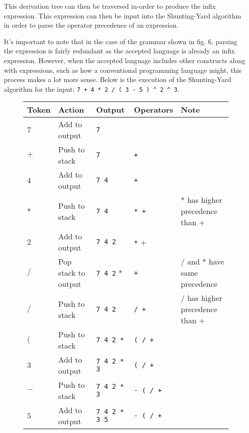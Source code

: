 \documentclass[12pt, letterpaper]{article}
\theoremstyle{definition}
\begin{document}
This derivation tree can then be traversed in-order to produce the infix expression. This expression can then be input into the Shunting-Yard algorithm in order to parse the operator precedence of an expression.

It's important to note that in the case of the grammar shown in fig. 6, parsing the expression is fairly redundant as the accepted language is already an infix expression. However, when the accepted language includes other constructs along with expressions, such as how a conventional programming language might, this process makes a lot more sense. Below is the execution of the Shunting-Yard algorithm for the input: \verb|7 + 4 * 2 / ( 3 - 5 ) ^ 2 ^ 3|.\textsuperscript{\cite{shunting-yard}}

\begin{figure}[H]
    \begin{center}
        \begin{tabular}{| m{1.2cm} | m{3.1cm} | m{3.6cm} | m{2.3cm} | m{3.5cm} |}
            \hline
            \textbf{Token} & \textbf{Action} & \textbf{Output} & \textbf{Operators} & \textbf{Note}\\
            \hline
            $7$ & Add to output & \verb|7| & &\\
            \hline
            $+$ & Push to stack & \verb|7| & \verb|+| &\\
            \hline
            $4$ & Add to output & \verb|7 4| & \verb|+| &\\
            \hline
            $*$ & Push to stack & \verb|7 4| & \verb|* +| & * has higher precedence than +\\
            \hline
            $2$ & Add to output & \verb|7 4 2| & \verb|*| + &\\
            \hline
            $/$ & Pop stack to output & \verb|7 4 2| * & \verb|+| & / and * have same precedence\\
            \hline
            $/$ & Push to stack & \verb|7 4 2| & \verb|/ +| & / has higher precedence than +\\
            \hline
            $($ & Push to stack & \verb|7 4 2 *| & \verb|( / +| &\\
            \hline
            $3$ & Add to output & \verb|7 4 2 * 3| & \verb|( / +| &\\
            \hline
            $-$ & Push to stack & \verb|7 4 2 * 3| & \verb|- ( / +| &\\
            \hline
            $5$ & Add to output & \verb|7 4 2 * 3 5| & \verb|- ( / +| &\\

\end{tabular}
\end{center}
\end{figure}
\end{document}
